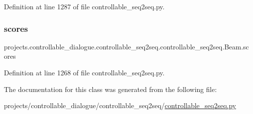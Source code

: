 Definition at line 1287 of file controllable\+\_\+seq2seq.\+py.

\mbox{\label{classprojects_1_1controllable__dialogue_1_1controllable__seq2seq_1_1controllable__seq2seq_1_1Beam_a3f644c74f23d3f49e51bd65b234405d0}} 
\subsubsection{\texorpdfstring{scores}{scores}}
{\footnotesize\ttfamily projects.\+controllable\+\_\+dialogue.\+controllable\+\_\+seq2seq.\+controllable\+\_\+seq2seq.\+Beam.\+scores}



Definition at line 1268 of file controllable\+\_\+seq2seq.\+py.



The documentation for this class was generated from the following file\+:\begin{DoxyCompactItemize}
\item 
projects/controllable\+\_\+dialogue/controllable\+\_\+seq2seq/\hyperlink{controllable__seq2seq_8py}{controllable\+\_\+seq2seq.\+py}\end{DoxyCompactItemize}
